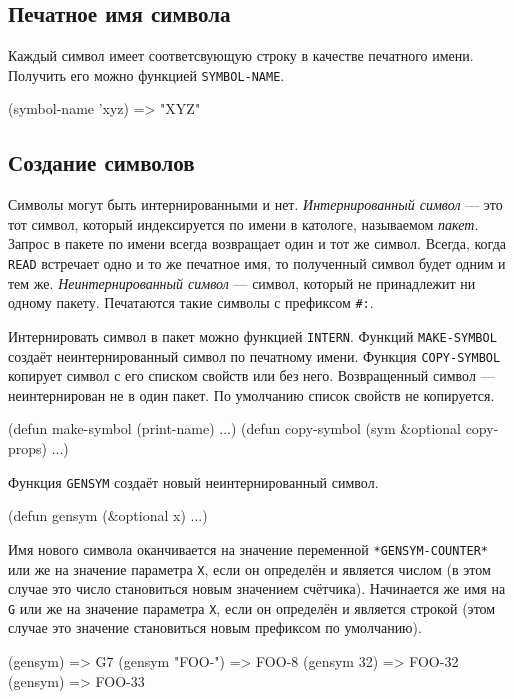 \subsection{Печатное имя символа}
Каждый символ имеет соответсвующую строку в качестве печатного имени. Получить его можно функцией \lstinline{SYMBOL-NAME}.
\begin{cllst}{}{}
(symbol-name 'xyz) => "XYZ"
\end{cllst}

\subsection{Создание символов}
Символы могут быть интернированными и нет. \emph{Интернированный символ} — это тот символ, который индексируется по имени в катологе, называемом \emph{пакет}. Запрос в пакете по имени всегда возвращает один и тот же символ. Всегда, когда \lstinline{READ} встречает одно и то же печатное имя, то полученный символ будет одним и тем же. \emph{Неинтернированный символ} — символ, который не принадлежит ни одному пакету. Печатаются такие символы с префиксом \lstinline{#:}.

Интернировать символ в пакет можно функцией \lstinline{INTERN}. Функций \lstinline{MAKE-SYMBOL} создаёт неинтернированный символ по печатному имени. Функция \lstinline{COPY-SYMBOL} копирует символ с его списком свойств или без него. Возвращенный символ — неинтернирован не в один пакет. По умолчанию список свойств не копируется.
\begin{cllst}{}{}
(defun make-symbol (print-name) ...)
(defun copy-symbol (sym &optional copy-props) ...)
\end{cllst}

Функция \lstinline{GENSYM} создаёт новый неинтернированный символ.
\begin{cllst}{}{}
(defun gensym (&optional x) ...)
\end{cllst}

Имя нового символа оканчивается на значение переменной \lstinline{*GENSYM-COUNTER*} или же на значение параметра \lstinline{X}, если он определён и является числом (в этом случае это число становиться новым значением счётчика). Начинается же имя на \lstinline{G} или же на значение параметра \lstinline{X}, если он определён и является строкой (этом случае это значение становиться новым префиксом по умолчанию).
\begin{cllst}{}{}
(gensym) => G7
(gensym "FOO-") => FOO-8
(gensym 32) => FOO-32
(gensym) => FOO-33
\end{cllst}

